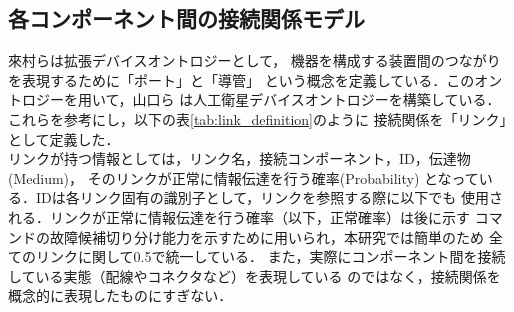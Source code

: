 \documentclass[11pt]{jsreport}
\begin{document}
\newpage
\subsection{各コンポーネント間の接続関係モデル}
來村ら\cite{Kitamura01}は拡張デバイスオントロジーとして，
機器を構成する装置間のつながりを表現するために「ポート」と「導管」%
という概念を定義している．このオントロジーを用いて，山口ら\cite{Yamaguchi2014}
は人工衛星デバイスオントロジーを構築している．
これらを参考にし，以下の表\ref{tab:link_definition}のように
接続関係を「リンク」として定義した．\\%
リンクが持つ情報としては，リンク名，接続コンポーネント，ID，伝達物(Medium)，
そのリンクが正常に情報伝達を行う確率(Probability)%
となっている．IDは各リンク固有の識別子として，リンクを参照する際に以下でも
使用される．リンクが正常に情報伝達を行う確率（以下，正常確率）は後に示す
コマンドの故障候補切り分け能力を示すために用いられ，本研究では簡単のため
全てのリンクに関して0.5で統一している．
また，実際にコンポーネント間を接続している実態（配線やコネクタなど）を表現している
のではなく，接続関係を概念的に表現したものにすぎない．
\end{document}
